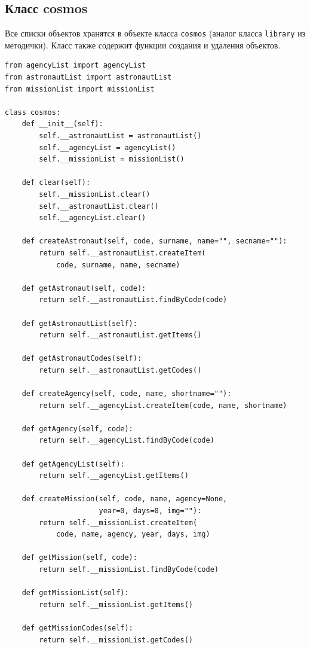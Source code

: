\documentclass[a4paper,14pt]{extarticle}
\begin{document}
\subsection{Класс cosmos}

Все списки объектов хранятся в объекте класса \texttt{cosmos} (аналог класса \texttt{library} из методички). Класс также содержит функции создания и удаления объектов.

\begin{lstlisting}[caption={Модуль \texttt{cosmos.py} (основные методы)}]
from agencyList import agencyList
from astronautList import astronautList
from missionList import missionList

class cosmos:
    def __init__(self):
        self.__astronautList = astronautList()
        self.__agencyList = agencyList()
        self.__missionList = missionList()

    def clear(self):
        self.__missionList.clear()
        self.__astronautList.clear()
        self.__agencyList.clear()

    def createAstronaut(self, code, surname, name="", secname=""):
        return self.__astronautList.createItem(
            code, surname, name, secname)

    def getAstronaut(self, code):
        return self.__astronautList.findByCode(code)

    def getAstronautList(self):
        return self.__astronautList.getItems()

    def getAstronautCodes(self):
        return self.__astronautList.getCodes()

    def createAgency(self, code, name, shortname=""):
        return self.__agencyList.createItem(code, name, shortname)

    def getAgency(self, code):
        return self.__agencyList.findByCode(code)

    def getAgencyList(self):
        return self.__agencyList.getItems()

    def createMission(self, code, name, agency=None,
                      year=0, days=0, img=""):
        return self.__missionList.createItem(
            code, name, agency, year, days, img)

    def getMission(self, code):
        return self.__missionList.findByCode(code)

    def getMissionList(self):
        return self.__missionList.getItems()

    def getMissionCodes(self):
        return self.__missionList.getCodes()
\end{lstlisting}
\end{document}
